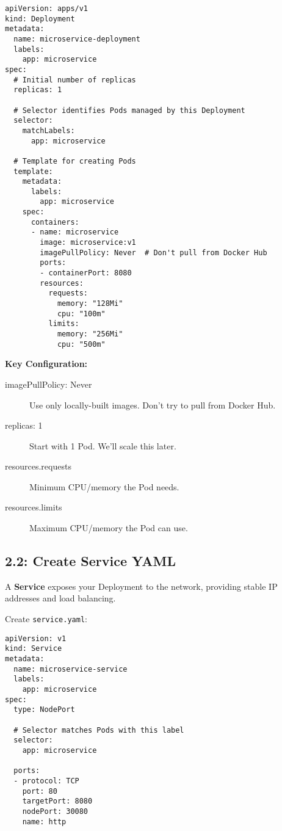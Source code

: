 \documentclass[12pt,a4paper]{article}
\begin{document}
\begin{lstlisting}[caption=deployment.yaml - Kubernetes Deployment]
apiVersion: apps/v1
kind: Deployment
metadata:
  name: microservice-deployment
  labels:
    app: microservice
spec:
  # Initial number of replicas
  replicas: 1

  # Selector identifies Pods managed by this Deployment
  selector:
    matchLabels:
      app: microservice

  # Template for creating Pods
  template:
    metadata:
      labels:
        app: microservice
    spec:
      containers:
      - name: microservice
        image: microservice:v1
        imagePullPolicy: Never  # Don't pull from Docker Hub
        ports:
        - containerPort: 8080
        resources:
          requests:
            memory: "128Mi"
            cpu: "100m"
          limits:
            memory: "256Mi"
            cpu: "500m"
\end{lstlisting}

\textbf{Key Configuration:}

\begin{description}
    \item[imagePullPolicy: Never] Use only locally-built images. Don't try to pull from Docker Hub.
    \item[replicas: 1] Start with 1 Pod. We'll scale this later.
    \item[resources.requests] Minimum CPU/memory the Pod needs.
    \item[resources.limits] Maximum CPU/memory the Pod can use.
\end{description}

\subsection{2.2: Create Service YAML}

A \textbf{Service} exposes your Deployment to the network, providing stable IP addresses and load balancing.

Create \texttt{service.yaml}:

\begin{lstlisting}[caption=service.yaml - Kubernetes Service]
apiVersion: v1
kind: Service
metadata:
  name: microservice-service
  labels:
    app: microservice
spec:
  type: NodePort

  # Selector matches Pods with this label
  selector:
    app: microservice

  ports:
  - protocol: TCP
    port: 80
    targetPort: 8080
    nodePort: 30080
    name: http
\end{lstlisting}
\end{document}
